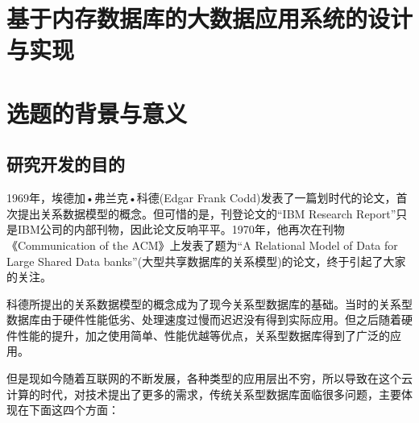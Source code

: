 \documentclass[proposal]{zjutreport}
\begin{document}



\frontmatter

\begingroup %
\let\clearpage\relax %

\titleformat{\chapter}[block]{\sihao\heiti\filcenter\bfseries}{\CJKnumber{\thechapter}}{1ex}{}{} %
\chapter*{基于内存数据库的大数据应用系统的设计与实现}
{} %

\mainmatter
\chapter{选题的背景与意义}
\section{研究开发的目的}
1969年，埃德加•弗兰克•科德(Edgar Frank Codd)发表了一篇划时代的论文，首次提出关系数据模型的概念。但可惜的是，刊登论文的“IBM Research Report”只是IBM公司的内部刊物，因此论文反响平平。1970年，他再次在刊物《Communication of the ACM》上发表了题为“A Relational Model of Data for Large Shared Data banks”(大型共享数据库的关系模型)的论文，终于引起了大家的关注。

科德所提出的关系数据模型的概念成为了现今关系型数据库的基础。当时的关系型数据库由于硬件性能低劣、处理速度过慢而迟迟没有得到实际应用。但之后随着硬件性能的提升，加之使用简单、性能优越等优点，关系型数据库得到了广泛的应用。

但是现如今随着互联网的不断发展，各种类型的应用层出不穷，所以导致在这个云计算的时代，对技术提出了更多的需求，传统关系型数据库面临很多问题，主要体现在下面这四个方面：
\end{document}
